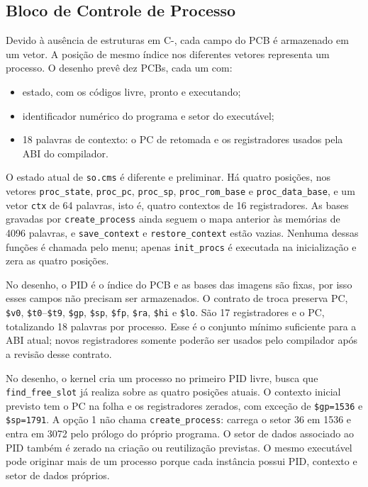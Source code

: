 \documentclass[
    12pt,
    openright,
    a4paper,
    english,
    brazilian
]{abntex2}
\begin{document}
\subsection{Bloco de Controle de Processo}

Devido à ausência de estruturas em C-, cada campo do PCB é armazenado em um vetor. A posição de mesmo índice nos diferentes vetores representa um processo. O desenho prevê dez PCBs, cada um com:

\begin{itemize}
    \item estado, com os códigos livre, pronto e executando;
    \item identificador numérico do programa e setor do executável;
    \item 18 palavras de contexto: o PC de retomada e os registradores usados pela ABI do compilador.
\end{itemize}

O estado atual de \texttt{so.cms} é diferente e preliminar. Há quatro posições, nos vetores \texttt{proc\_state}, \texttt{proc\_pc}, \texttt{proc\_sp}, \texttt{proc\_rom\_base} e \texttt{proc\_data\_base}, e um vetor \texttt{ctx} de 64 palavras, isto é, quatro contextos de 16 registradores. As bases gravadas por \texttt{create\_process} ainda seguem o mapa anterior às memórias de 4096 palavras, e \texttt{save\_context} e \texttt{restore\_context} estão vazias. Nenhuma dessas funções é chamada pelo menu; apenas \texttt{init\_procs} é executada na inicialização e zera as quatro posições.

No desenho, o PID é o índice do PCB e as bases das imagens são fixas, por isso esses campos não precisam ser armazenados. O contrato de troca preserva PC, \texttt{\$v0}, \texttt{\$t0}--\texttt{\$t9}, \texttt{\$gp}, \texttt{\$sp}, \texttt{\$fp}, \texttt{\$ra}, \texttt{\$hi} e \texttt{\$lo}. São 17 registradores e o PC, totalizando 18 palavras por processo. Esse é o conjunto mínimo suficiente para a ABI atual; novos registradores somente poderão ser usados pelo compilador após a revisão desse contrato.

No desenho, o kernel cria um processo no primeiro PID livre, busca que \texttt{find\_free\_slot} já realiza sobre as quatro posições atuais. O contexto inicial previsto tem o PC na folha e os registradores zerados, com exceção de \texttt{\$gp=1536} e \texttt{\$sp=1791}. A opção 1 não chama \texttt{create\_process}: carrega o setor 36 em 1536 e entra em 3072 pelo prólogo do próprio programa. O setor de dados associado ao PID também é zerado na criação ou reutilização previstas. O mesmo executável pode originar mais de um processo porque cada instância possui PID, contexto e setor de dados próprios.
\end{document}
